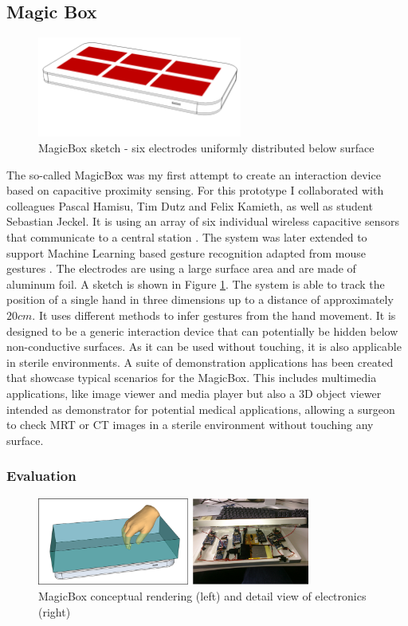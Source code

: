 \subsection{Magic Box}
\label{ch:prot_magicbox}
\begin{figure}[ht]
\centering
\includegraphics[width=0.6\textwidth]{images/magicbox}
\caption{MagicBox sketch - six electrodes uniformly distributed below surface}
\label{fig:magicbox_sketch}
\end{figure}
The so-called MagicBox was my first attempt to create an interaction device based on capacitive proximity sensing. For this prototype I collaborated with colleagues Pascal Hamisu, Tim Dutz and Felix Kamieth, as well as student Sebastian Jeckel. It is using an array of six individual wireless capacitive sensors that communicate to a central station \cite{Braun2011MultiInputDevice}. The system was later extended to support Machine Learning based gesture recognition adapted from mouse gestures \cite{braun2013capacitive}. The electrodes are using a large surface area and are made of aluminum foil. A sketch is shown in Figure \ref{fig:magicbox_sketch}. The system is able to track the position of a single hand in three dimensions up to a distance of approximately $20cm$. It uses different methods to infer gestures from the hand movement. 
It is designed to be a generic interaction device that can potentially be hidden below non-conductive surfaces. As it can be used without touching, it is also applicable in sterile environments. A suite of demonstration applications has been created that showcase typical scenarios for the MagicBox. This includes multimedia applications, like image viewer and media player but also a 3D object viewer intended as demonstrator for potential medical applications, allowing a surgeon to check MRT or CT images in a sterile environment without touching any surface.

\subsubsection{Evaluation}
\begin{figure}[ht]
\centering
\includegraphics[width=0.8\textwidth]{images/magicbox_proto}
\caption{MagicBox conceptual rendering (left) and detail view of electronics (right) \cite{Braun2011MultiInputDevice}}
\label{fig:magicbox_proto}
\end{figure}

